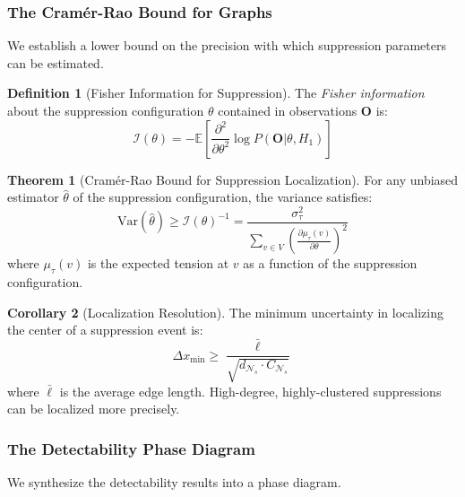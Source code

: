 \documentclass[12pt,a4paper]{article}
\theoremstyle{definition}
\newtheorem{definition}{Definition}[section]
\newtheorem{theorem}{Theorem}[section]
\newtheorem{corollary}[theorem]{Corollary}
\theoremstyle{remark}
\newcommand{\NS}{\mathcal{N}_s}          %
\begin{document}
\subsubsection{The Cramér-Rao Bound for Graphs}

We establish a lower bound on the precision with which suppression parameters can be estimated.

\begin{definition}[Fisher Information for Suppression]
The \emph{Fisher information} about the suppression configuration $\theta$ contained in observations $\mathbf{O}$ is:
\begin{equation}
    \mathcal{I}(\theta) = -\mathbb{E}\left[ \frac{\partial^2}{\partial \theta^2} \log P(\mathbf{O} | \theta, H_1) \right]
\end{equation}
\end{definition}

\begin{theorem}[Cramér-Rao Bound for Suppression Localization]
\label{thm:cramer-rao}
For any unbiased estimator $\hat{\theta}$ of the suppression configuration, the variance satisfies:
\begin{equation}
    \boxed{
    \text{Var}(\hat{\theta}) \geq \mathcal{I}(\theta)^{-1} = \frac{\sigma_\tau^2}{\sum_{v \in V} \left( \frac{\partial \mu_\tau(v)}{\partial \theta} \right)^2}
    }
\end{equation}
where $\mu_\tau(v)$ is the expected tension at $v$ as a function of the suppression configuration.
\end{theorem}

\begin{corollary}[Localization Resolution]
The minimum uncertainty in localizing the center of a suppression event is:
\begin{equation}
    \Delta x_{\min} \geq \frac{\bar{\ell}}{\sqrt{d_{\NS} \cdot C_{\NS}}}
\end{equation}
where $\bar{\ell}$ is the average edge length. High-degree, highly-clustered suppressions can be localized more precisely.
\end{corollary}

\subsubsection{The Detectability Phase Diagram}

We synthesize the detectability results into a phase diagram.
\end{document}
